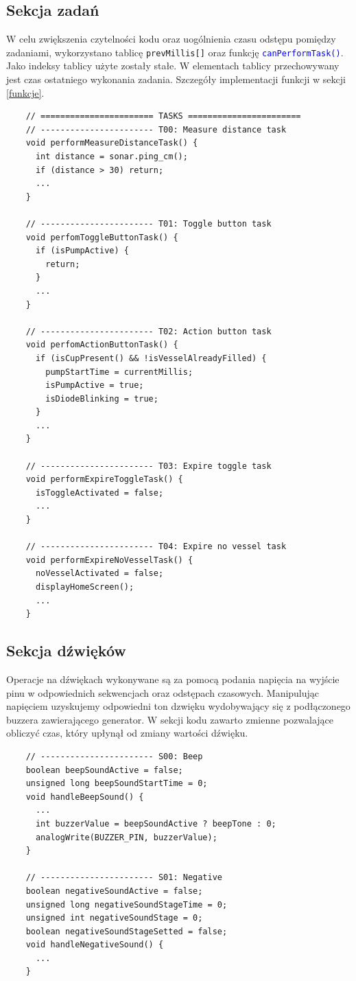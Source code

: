 \documentclass[11pt]{article}
\begin{document}
\subsection{Sekcja zadań}
\label{zadania}
W celu zwiększenia czytelności kodu oraz uogólnienia czasu odstępu pomiędzy zadaniami, wykorzystano tablicę \texttt{prevMillis[]} oraz funkcję \textcolor{blue}{\texttt{canPerformTask()}}. Jako indeksy tablicy użyte zostały stałe. W elementach tablicy przechowywany jest czas ostatniego wykonania zadania. Szczegóły implementacji funkcji w sekcji \ref{funkcje}.
\begin{verbatim}
    // ======================= TASKS =======================
    // ----------------------- T00: Measure distance task
    void performMeasureDistanceTask() {
      int distance = sonar.ping_cm();
      if (distance > 30) return;
      ...
    }

    // ----------------------- T01: Toggle button task
    void perfomToggleButtonTask() {
      if (isPumpActive) {
        return;
      }
      ...
    }
    
    // ----------------------- T02: Action button task
    void perfomActionButtonTask() {
      if (isCupPresent() && !isVesselAlreadyFilled) {
        pumpStartTime = currentMillis;
        isPumpActive = true;
        isDiodeBlinking = true;
      }
      ...
    }
    
    // ----------------------- T03: Expire toggle task
    void performExpireToggleTask() {
      isToggleActivated = false;
      ...
    }
    
    // ----------------------- T04: Expire no vessel task
    void performExpireNoVesselTask() {
      noVesselActivated = false;
      displayHomeScreen();
      ...
    }
\end{verbatim}

\newpage
\subsection{Sekcja dźwięków}
\label{dzwieki}
Operacje na dźwiękach wykonywane są za pomocą podania napięcia na wyjście pinu w odpowiednich sekwencjach oraz odstępach czasowych. Manipulując napięciem uzyskujemy odpowiedni ton dzwięku wydobywający się z podłączonego buzzera zawierającego generator. W sekcji kodu zawarto zmienne pozwalające obliczyć czas, który upłynął od zmiany wartości dźwięku.
\begin{verbatim}
    // ----------------------- S00: Beep
    boolean beepSoundActive = false;
    unsigned long beepSoundStartTime = 0;
    void handleBeepSound() {
      ...
      int buzzerValue = beepSoundActive ? beepTone : 0;
      analogWrite(BUZZER_PIN, buzzerValue);
    }
    
    // ----------------------- S01: Negative
    boolean negativeSoundActive = false;
    unsigned long negativeSoundStageTime = 0;
    unsigned int negativeSoundStage = 0;
    boolean negativeSoundStageSetted = false;
    void handleNegativeSound() {
      ...
    }
\end{verbatim}
\end{document}
